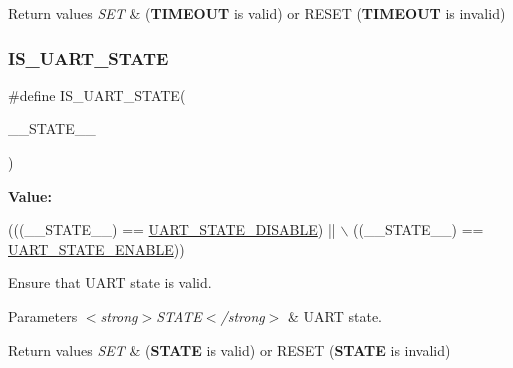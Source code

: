 \begin{DoxyRetVals}{Return values}
{\em S\+ET} & ({\bfseries T\+I\+M\+E\+O\+UT} is valid) or R\+E\+S\+ET ({\bfseries T\+I\+M\+E\+O\+UT} is invalid) \\
\hline
\end{DoxyRetVals}
\mbox{\label{group___u_a_r_t___private___macros_ga754855879401ab846803a03eec2f7f10}} 
\subsubsection{\texorpdfstring{I\+S\+\_\+\+U\+A\+R\+T\+\_\+\+S\+T\+A\+TE}{IS\_UART\_STATE}}
{\footnotesize\ttfamily \#define I\+S\+\_\+\+U\+A\+R\+T\+\_\+\+S\+T\+A\+TE(\begin{DoxyParamCaption}\item[{}]{\+\_\+\+\_\+\+S\+T\+A\+T\+E\+\_\+\+\_\+ }\end{DoxyParamCaption})}

{\bfseries Value\+:}
\begin{DoxyCode}
(((\_\_STATE\_\_) == \hyperlink{group___u_a_r_t___state_gaf32492459be708981ebc5615194cdae9}{UART\_STATE\_DISABLE}) || \(\backslash\)
                                  ((\_\_STATE\_\_) == \hyperlink{group___u_a_r_t___state_gab6b470dccef2a518a45554b171acff5b}{UART\_STATE\_ENABLE}))
\end{DoxyCode}


Ensure that U\+A\+RT state is valid. 


\begin{DoxyParams}{Parameters}
{\em $<$strong$>$\+S\+T\+A\+T\+E$<$/strong$>$} & U\+A\+RT state. \\
\hline
\end{DoxyParams}

\begin{DoxyRetVals}{Return values}
{\em S\+ET} & ({\bfseries S\+T\+A\+TE} is valid) or R\+E\+S\+ET ({\bfseries S\+T\+A\+TE} is invalid) \\
\hline
\end{DoxyRetVals}
\mbox{\label{group___u_a_r_t___private___macros_ga0fa4dec621a59f8c07f42548cdbb7f18}} 
